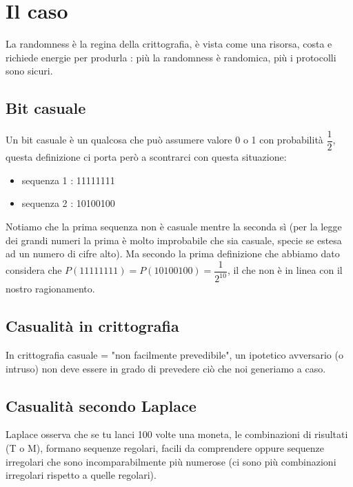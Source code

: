 \chapter{Il caso}

La randomness è la regina della crittografia, è vista come una risorsa, costa e richiede energie per produrla : più la randomness è randomica, più i protocolli sono sicuri. 

\section{Bit casuale}

Un bit casuale è un qualcosa che può assumere valore 0 o 1 con probabilità $\dfrac{1}{2}$, questa definizione ci porta però a scontrarci con questa situazione:
\begin{itemize}
	\item sequenza 1 : 11111111
	\item sequenza 2 : 10100100
\end{itemize}
Notiamo che la prima sequenza non è casuale mentre la seconda sì (per la legge dei grandi numeri la prima è molto improbabile che sia casuale, specie se estesa ad un numero di cifre alto).
Ma secondo la prima definizione che abbiamo dato considera che $P(11111111) = P(10100100) = \dfrac{1}{2^{10}}$, il che non è in linea con il nostro ragionamento.

\section{Casualità in crittografia}

In crittografia casuale = "non facilmente prevedibile", un ipotetico avversario (o intruso) non deve essere in grado di prevedere ciò che noi generiamo a caso.

\section{Casualità secondo Laplace}
Laplace osserva che se tu lanci 100 volte una moneta, le combinazioni di risultati (T o M), formano sequenze regolari, facili da comprendere oppure sequenze irregolari che sono incomparabilmente più numerose (ci sono più combinazioni irregolari rispetto a quelle regolari).

